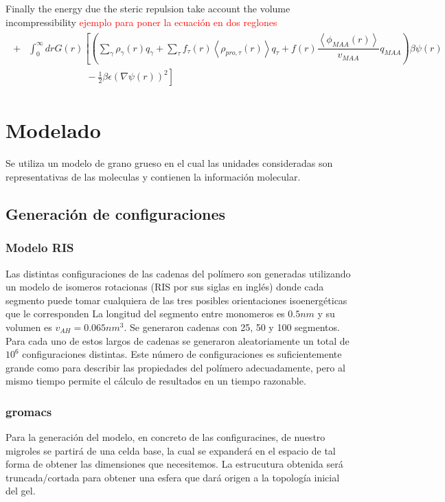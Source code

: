 Finally the energy due the steric repulsion  take account the volume incompressibility
\textcolor{red}{ejemplo para poner la ecuaci\'on en dos reglones}
\begin{align*}
    \begin{aligned}
    +  &\int_0^\infty drG(r)\left[\left(\sum_{\gamma } {\rho_\gamma(r) q_\gamma + \sum_\tau{f_\tau(r) \left<\rho_{pro,\tau}(r)\right> q_\tau} +  f(r)\dfrac{\left<\phi_{MAA}(r)\right>}{v_{MAA}}q_{MAA}}\right)\beta\psi(r) \right.\\  &\left. \hspace{6em}-\frac{1}{2}\beta\epsilon(\nabla\psi(r))^2 \right]
    \end{aligned}
\end{align*}

\section{Modelado}

Se utiliza un modelo de grano grueso en el cual las unidades consideradas son representativas de las moleculas y contienen la informaci\'on molecular.

\subsection{Generaci\'on de configuraciones}

\subsubsection{Modelo RIS}
Las distintas configuraciones de las cadenas del polímero son generadas utilizando un modelo de isomeros rotacionas (RIS por sus siglas en inglés) donde cada segmento puede tomar cualquiera de las tres posibles orientaciones isoenergéticas que le corresponden \addcite[Flory]
La longitud del segmento entre monomeros es $0.5 nm$ y su volumen es $v_{AH}= 0.065 nm^3$. Se generaron cadenas con 25, 50 y 100 segmentos. Para cada uno de estos largos de cadenas se generaron aleatoriamente un total de $10^6$ configuraciones distintas. Este número de configuraciones es suficientemente grande como para describir las propiedades del polímero adecuadamente, pero al mismo tiempo permite el cálculo de resultados en un tiempo razonable.

\subsubsection{gromacs}
Para la generaci\'on del modelo, en concreto de las configuracines, de nuestro migroles se partir\'a de una celda base, la cual se expander\'a en el espacio de tal forma de obtener las dimensiones que necesitemos.
La estrucutura obtenida  ser\'a truncada/cortada para obtener una esfera que dará origen a la topología inicial del gel.

